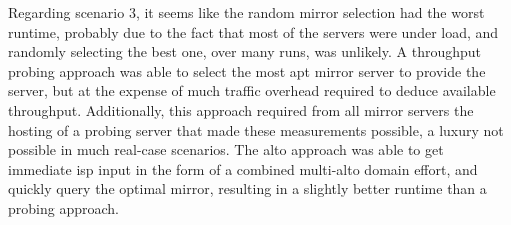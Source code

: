     Regarding scenario 3, it seems like the random mirror selection had the worst runtime, probably due to the fact that most of the servers were under load, and randomly selecting the best one, over many runs, was unlikely.
    A throughput probing approach was able to select the most apt mirror server to provide the server, but at the expense of much traffic overhead required to deduce available throughput.
    Additionally, this approach required from all mirror servers the hosting of a probing server that made these measurements possible, a luxury not possible in much real-case scenarios.
    The \gls{alto} approach was able to get immediate \gls{isp} input in the form of a combined multi-\gls{alto} domain effort, and quickly query the optimal mirror, resulting in a slightly better runtime than a probing approach.
